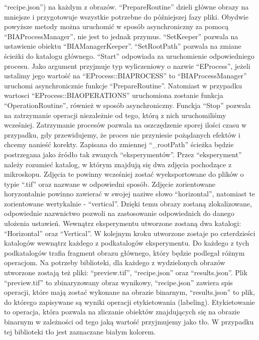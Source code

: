 \documentclass{article}
\begin{document}
{            ``recipe.json'') na każdym z obrazów.
            ``PrepareRoutine'' dzieli główne obrazy na mniejsze i przygotowuje wszystkie potrzebne do późniejszej fazy pliki.
            Obydwie powyższe metody można uruchomić w sposób asynchroniczny za pomocą ``BIAProcessManager'', nie jest to jednak przymus.
            ``SetKeeper'' pozwala na ustawienie obiektu ``BIAManagerKeeper''.
            ``SetRootPath'' pozwala na zmiane ścieżki do katalogu głównego.
            ``Start'' odpowiada za uruchomienie odpowiedniego procesu. Jako argument przyjmuje typ wyliczeniowy o nazwie ``EProcess'', jeżeli ustalimy jego wartość na ``EProcess::BIAPROCESS'' to ``BIAProcessManager'' uruchomi asynchronicznie funkcje ``PrepareRoutine''. Natomiast w przypadku wartosci ``EProcess::BIAOPERATIONS'' uruchomiona zostanie funkcja ``OperationRoutine'', również w sposób asynchroniczny.
            Funckja ``Stop'' pozwala na zatrzymanie operacji niezależnie od tego, którą z nich uruchomiliśmy wcześniej.
            Zatrzymanie procesów pozwala na oszczędzenie sporej ilości czasu w przypadku, gdy przewidujemy, że proces nie przyniesie pożądanych efektów i chcemy nanieść korekty.
            Zapisana do zmiennej ``\_rootPath'' ścieżka będzie postrzegana jako źródło tak zwanych ``eksperymentów''.
            Przez ``eksperyment'' należy rozumieć katalog, w którym znajdują się dwa zdjęcia pochodzące z mikroskopu.
            Zdjęcia te powinny wcześniej zostać wyeksportowane do plików o typie ``.tif'' oraz nazwane w odpowiedni sposób.
            Zdjęcie zorientowane horyzontalnie powinno zawierać w swojej naziwe słowo ``horizontal'', natomiast te zorientowane wertykalnie - ``vertical''.
            Dzięki temu obrazy zostaną zlokalizowane, odpowiednie nazwnictwo pozwoli na zastosowanie odpowiednich do danego ułożenia ustawień.
            Wewnątrz eksperymentu utworzone zostaną dwa katalogi: ``Horizontal'' oraz ``Vertical''.
            W kolejnym kroku utworzone zostaje po czterdzieści katalogów wewnątrz każdego z podkatalogów eksperymentu.
            Do każdego z tych podkatalogów trafia fragment obrazu głównego, który będzie podlegał różnym operacjom.
            Na potrzeby biblioteki, dla każdego z wydzielonych obrazów utworzone zostają też pliki: ``preview.tif'', ``recipe.json'' oraz ``results.json''.
            Plik ``preview.tif'' to zbinaryzowany obraz wynikowy, ``recipe.json'' zawiera spis operacji, które mają zostać wykonane na obrazie binarnym, ``results.json'' to plik, do którego zapisywane są wyniki operacji etykietowania (labeling).
            Etykietowanie to operacja, która pozwala na zliczanie obiektów znajdujących się na obrazie binarnym w zależności od tego jaką wartość przyjmujemy jako tło.
            W przypadku tej biblioteki tło jest zaznaczane białym kolorem.
        }
\end{document}
